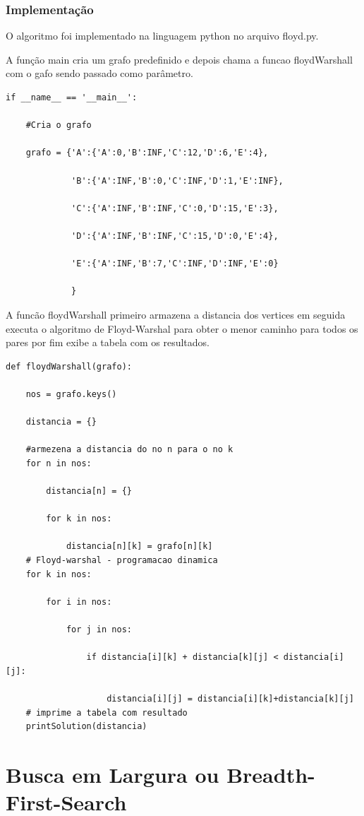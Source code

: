 \documentclass[a4paper,12pt]{article}
\begin{document}
\subsubsection{Implementação}
O algoritmo foi implementado na linguagem python no arquivo floyd.py.

A função main cria um grafo predefinido e depois chama a funcao floydWarshall com o gafo sendo passado como parâmetro.
\begin{lstlisting}
if __name__ == '__main__':
	
	#Cria o grafo

    grafo = {'A':{'A':0,'B':INF,'C':12,'D':6,'E':4},

             'B':{'A':INF,'B':0,'C':INF,'D':1,'E':INF},

             'C':{'A':INF,'B':INF,'C':0,'D':15,'E':3},

             'D':{'A':INF,'B':INF,'C':15,'D':0,'E':4},

             'E':{'A':INF,'B':7,'C':INF,'D':INF,'E':0}

             }
\end{lstlisting}
 
A funcão floydWarshall primeiro armazena a distancia dos vertices em seguida executa o algoritmo de Floyd-Warshal para obter o menor caminho para todos os pares por fim exibe a tabela com os resultados.
\begin{lstlisting}
def floydWarshall(grafo):

    nos = grafo.keys()

    distancia = {}
	
	#armezena a distancia do no n para o no k
    for n in nos:

        distancia[n] = {}

        for k in nos:

            distancia[n][k] = grafo[n][k]
	# Floyd-warshal - programacao dinamica
    for k in nos:

        for i in nos:

            for j in nos:

                if distancia[i][k] + distancia[k][j] < distancia[i][j]:

                    distancia[i][j] = distancia[i][k]+distancia[k][j]
	# imprime a tabela com resultado
    printSolution(distancia)
\end{lstlisting}

\newpage
\section{Busca em Largura ou Breadth-First-Search}
\end{document}
